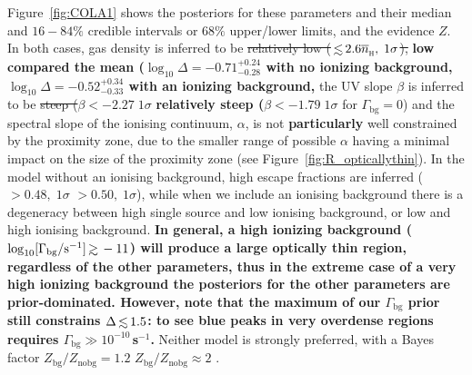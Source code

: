 \documentclass[fleqn,usenatbib]{mnras}
\providecommand{\DIFadd}[1]{{\protect\color{Green} {\bf #1}}} %
\providecommand{\DIFdel}[1]{{\protect\color{Gray} \scriptsize \sout{#1}}} %
\providecommand{\DIFaddbegin}{} %
\providecommand{\DIFaddend}{} %
\providecommand{\DIFdelbegin}{} %
\providecommand{\DIFdelend}{} %
\newcommand{\DIFscaledelfig}{0.5}
\newlength{\DIFdelgraphicswidth} %
\newlength{\DIFdelgraphicsheight} %
\newcommand{\DIFaddincludegraphics}[2][]{{\color{purple}\fbox{\DIFOincludegraphics[#1]{#2}}}} %
\newcommand{\DIFdelincludegraphics}[2][]{%
\sbox{\DIFdelgraphicsbox}{\DIFOincludegraphics[#1]{#2}}%
\settoboxwidth{\DIFdelgraphicswidth}{\DIFdelgraphicsbox} %
\settoboxtotalheight{\DIFdelgraphicsheight}{\DIFdelgraphicsbox} %
\scalebox{\DIFscaledelfig}{%
\parbox[b]{\DIFdelgraphicswidth}{\usebox{\DIFdelgraphicsbox}\\[-\baselineskip] \rule{\DIFdelgraphicswidth}{0em}}\llap{\resizebox{\DIFdelgraphicswidth}{\DIFdelgraphicsheight}{%
\setlength{\unitlength}{\DIFdelgraphicswidth}%
\begin{picture}(1,1)%
\thicklines\linethickness{2pt} %
{\color[rgb]{1,0,0}\put(0,0){\framebox(1,1){}}}%
{\color[rgb]{1,0,0}\put(0,0){\line( 1,1){1}}}%
{\color[rgb]{1,0,0}\put(0,1){\line(1,-1){1}}}%
\end{picture}%
}\hspace*{3pt}}} %
} %
\DeclareRobustCommand{\DIFaddbegin}{\DIFOaddbegin \let\includegraphics\DIFaddincludegraphics} %
\DeclareRobustCommand{\DIFaddend}{\DIFOaddend \let\includegraphics\DIFOincludegraphics} %
\DeclareRobustCommand{\DIFdelbegin}{\DIFOdelbegin \let\includegraphics\DIFdelincludegraphics} %
\DeclareRobustCommand{\DIFdelend}{\DIFOaddend \let\includegraphics\DIFOincludegraphics} %
\begin{document}
Figure~\ref{fig:COLA1} shows the posteriors for these parameters and their median and $16-84\%$ credible intervals or $68\%$ upper/lower limits, and the evidence $Z$. In both cases, gas density is inferred to be \DIFdelbegin \DIFdel{relatively low ($\simlt2.6\nh, \; 1\sigma$), }\DIFdelend \DIFaddbegin \DIFadd{low compared the mean ($\log_{10} \Delta = -0.71_{-0.28}^{+0.24}$ with no ionizing background, $\log_{10} \Delta = -0.52_{-0.33}^{+0.34}$ with an ionizing background, }\DIFaddend the UV slope $\beta$ is inferred to be \DIFdelbegin \DIFdel{steep ($\beta < -2.27 \; 1\sigma$ }\DIFdelend \DIFaddbegin \DIFadd{relatively steep ($\beta < -1.79 \; 1\sigma$ }\DIFaddend for $\Gamma_\mathrm{bg} = 0$) and the spectral slope of the ionising continuum, $\alpha$, is not \DIFaddbegin \DIFadd{particularly }\DIFaddend well constrained by the proximity zone, due to the smaller range of possible $\alpha$ having a minimal impact on the size of the proximity zone (see Figure~\ref{fig:R_opticallythin}). In the model without an ionising background, high escape fractions are inferred (\DIFdelbegin \DIFdel{$>0.48, \; 1\sigma$}\DIFdelend \DIFaddbegin \DIFadd{$>0.50, \; 1\sigma$}\DIFaddend ), while when we include an ionising background there is a degeneracy between high single source \fesc and low ionising background, or low \fesc and high ionising background. \DIFaddbegin \DIFadd{In general, a high ionizing background ($\log_{10}[\Gamma_\mathrm{bg}/\mathrm{s}^{-1}] \simgt -11$) will produce a large optically thin region, regardless of the other parameters, thus in the extreme case of a very high ionizing background the posteriors for the other parameters are prior-dominated. However, note that the maximum of our $\Gamma_\mathrm{bg}$ prior still constrains $\Delta \simlt 1.5$: to see blue peaks in very overdense regions requires $\Gamma_\mathrm{bg} \gg 10^{-10}$\,s$^{-1}$. }\DIFaddend Neither model is strongly preferred, with a Bayes factor \DIFdelbegin \DIFdel{$Z_\mathrm{bg}/Z_\mathrm{no bg} = 1.2$ }\DIFdelend \DIFaddbegin \DIFadd{$Z_\mathrm{bg}/Z_\mathrm{no bg} \approx 2$ }\DIFaddend \citep[e.g.,][]{Trotta2008}.
\end{document}
